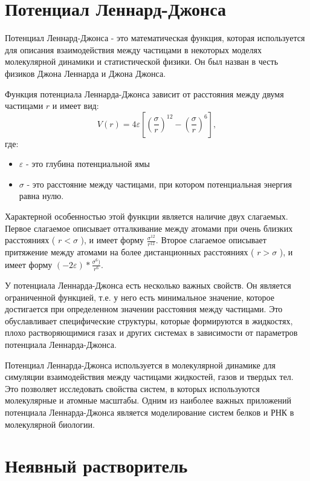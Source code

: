 \section{Потенциал Леннард-Джонса}

Потенциал Леннард-Джонса - это математическая функция, которая используется для описания взаимодействия между частицами в некоторых моделях молекулярной динамики и статистической физики. Он был назван в честь физиков Джона Леннарда и Джона Джонса.

Функция потенциала Леннарда-Джонса зависит от расстояния между двумя частицами $r$ и имеет вид:
\[ V(r) = 4\varepsilon \left[ \left( \frac{\sigma}{r} \right)^{12} - \left( \frac{\sigma}{r} \right)^6 \right], \]
где:
\begin{itemize}
	\item $\varepsilon$ - это глубина потенциальной ямы
	\item $\sigma$ - это расстояние между частицами, при котором потенциальная энергия равна нулю.
\end{itemize}

Характерной особенностью этой функции является наличие двух слагаемых. Первое слагаемое описывает отталкивание между атомами при очень близких расстояниях ( $r < \sigma$ ), и имеет форму $\frac{\sigma^{12}}{r^{12}}$. Второе слагаемое описывает притяжение между атомами на более дистанционных расстояниях ( $r > \sigma$ ), и имеет форму $(-2\varepsilon) * \frac{\sigma^6)}{r^6}$.

У потенциала Леннарда-Джонса есть несколько важных свойств. Он является ограниченной функцией, т.е. у него есть минимальное значение, которое достигается при определенном значении расстояния между частицами. Это обуславливает специфические структуры, которые формируются в жидкостях, плохо растворяющимися газах и других системах в зависимости от параметров потенциала Леннарда-Джонса.

Потенциал Леннарда-Джонса используется в молекулярной динамике для симуляции взаимодействия между частицами жидкостей, газов и твердых тел. Это позволяет исследовать свойства систем, в которых используются молекулярные и атомные масштабы. Одним из наиболее важных приложений потенциала Леннарда-Джонса является моделирование систем белков и РНК в молекулярной биологии.


\section{Неявный растворитель}


